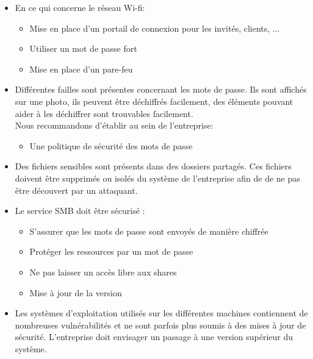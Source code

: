 \documentclass[french,paper=a4,oneside,captions=tableheading]{article}
\begin{document}
\begin{itemize}

\item En ce qui concerne le réseau Wi-fi:
\begin{itemize}
    \item [\textbullet] Mise en place d'un portail de connexion pour les invités, clients, ...
    \item [\textbullet] Utiliser un mot de passe fort
    \item [\textbullet] Mise en place d'un pare-feu\\
\end{itemize}

\item Différentes failles sont présentes concernant les mots de passe. Ils sont affichés sur une photo, ils peuvent être déchiffrés facilement, des éléments pouvant aider à les déchiffrer sont trouvables facilement.\\
Nous recommandons d'établir au sein de l'entreprise:
\begin{itemize}
    \item [\textbullet]Une politique de sécurité des mots de passe\\
\end{itemize}

\item Des fichiers sensibles sont présents dans des dossiers partagés. Ces fichiers doivent être supprimés ou isolés du système de l'entreprise afin de de ne pas être découvert par un attaquant.\\

\item Le service SMB doit être sécurisé :
\begin{itemize}
    \item [\textbullet]S'assurer que les mots de passe sont envoyés de manière chiffrée
    \item [\textbullet]Protéger les ressources par un mot de passe
    \item [\textbullet]Ne pas laisser un accès libre aux shares
    \item [\textbullet] Mise à jour de la version \\
\end{itemize}

\item Les systèmes d'exploitation utilisés sur les différentes machines contiennent de nombreuses vulnérabilités et ne sont parfois plus soumis à des mises à jour de sécurité. L'entreprise doit envisager un passage à une version supérieur du système.\\


\end{itemize}
\end{document}
